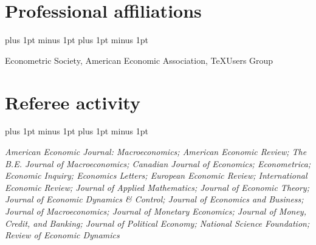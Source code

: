 \documentclass[letterpaper]{article}
\renewenvironment{itemize}{
  \begin{list}{}{
    \setlength{\leftmargin}{1.5em}
    \itemsep -1pt plus 1pt minus 1pt
    \topsep -1pt plus 1pt minus 1pt
  }
}{
  \end{list}
}
\begin{document}
\section*{Professional affiliations}
\begin{itemize}
\item Econometric Society, American Economic Association, \TeX Users Group
\end{itemize}

\section*{Referee activity}
\begin{itemize}
\item\textit{American Economic Journal: Macroeconomics; American Economic Review; The B.E. Journal of Macroeconomics; Canadian Journal of Economics; Econometrica; Economic Inquiry; Economics Letters; European Economic Review; International Economic Review; Journal of Applied Mathematics; Journal of Economic Theory; Journal of Economic Dynamics \& Control; Journal of Economics and Business; Journal of Macroeconomics; Journal of Monetary Economics; Journal of Money, Credit, and Banking; Journal of Political Economy; National Science Foundation; Review of Economic Dynamics}
\end{itemize}
\end{document}
